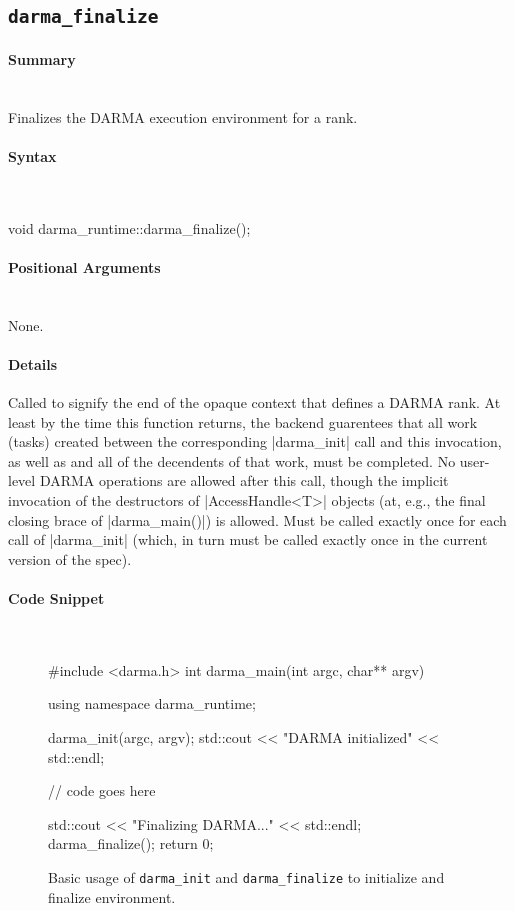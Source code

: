 
\subsection{\texttt{darma\_finalize}}
\label{ssec:api_fe_finalize}

\paragraph{Summary}\mbox{}\\
Finalizes the DARMA execution environment for a rank.

\paragraph{Syntax}\mbox{}\\ 
\begin{CppCode}
void darma_runtime::darma_finalize();
\end{CppCode}

\paragraph{Positional Arguments}\mbox{} \\
None. 

\paragraph{Details}\mbox{} 
Called to signify the end of the opaque context that defines a DARMA rank.  At
least by the time this function returns, the backend guarentees that all work
(tasks) created between the corresponding |darma_init| call and this
invocation, as well as and all of the decendents of that work, must be
completed.  No user-level DARMA operations are allowed after this call, though
the implicit invocation of the destructors of |AccessHandle<T>| objects
(at, e.g., the final closing brace of |darma_main()|) is allowed.  Must
be called exactly once for each call of |darma_init| (which, in turn
must be called exactly once in the current version of the spec).

\paragraph{Code Snippet}\mbox{} \\
\begin{figure}[!h]
\begin{CppCodeNumb}
#include <darma.h>
int darma_main(int argc, char** argv)
{
  using namespace darma_runtime;

  darma_init(argc, argv);
  std::cout << "DARMA initialized" << std::endl;

  // code goes here

  std::cout << "Finalizing DARMA..." << std::endl;
  darma_finalize();
  return 0;
}
\end{CppCodeNumb}
\caption{Basic usage of \texttt{darma\_init} and \texttt{darma\_finalize} 
to initialize and finalize environment.}
\label{fig:fe_api_init}
\end{figure}

